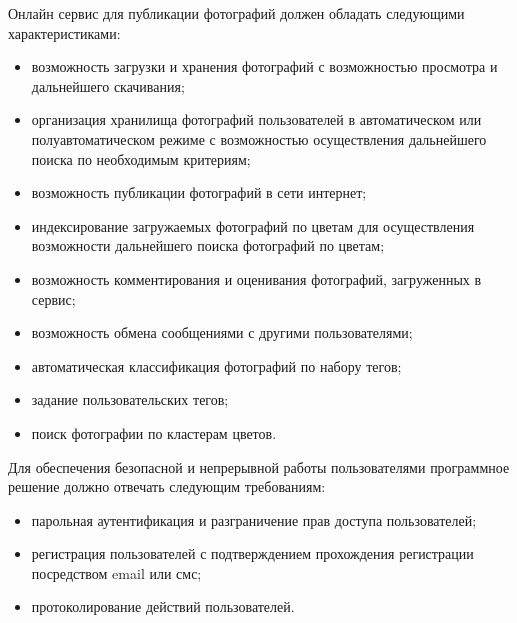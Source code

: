 Онлайн сервис для публикации фотографий должен обладать следующими характеристиками:
\begin{itemize}
    \item возможность загрузки и хранения фотографий с возможностью просмотра и дальнейшего скачивания;
    \item организация хранилища фотографий пользователей в автоматическом или полуавтоматическом режиме с возможностью осуществления дальнейшего поиска по необходимым критериям;
    \item возможность публикации фотографий в сети интернет;
    \item индексирование загружаемых фотографий по цветам для осуществления возможности дальнейшего поиска фотографий по цветам;
    \item возможность комментирования и оценивания фотографий, загруженных в сервис;
    \item возможность обмена сообщениями с другими пользователями;
    \item автоматическая классификация фотографий по набору тегов;
    \item задание пользовательских тегов;
    \item поиск фотографии по кластерам цветов.
\end{itemize}

Для обеспечения безопасной и непрерывной работы пользователями программное решение должно отвечать следующим требованиям:
\begin{itemize}
    \item парольная аутентификация и разграничение прав доступа пользователей;
    \item регистрация пользователей с подтверждением прохождения регистрации посредством email или смс;
    \item протоколирование действий пользователей.
\end{itemize}

\clearpage